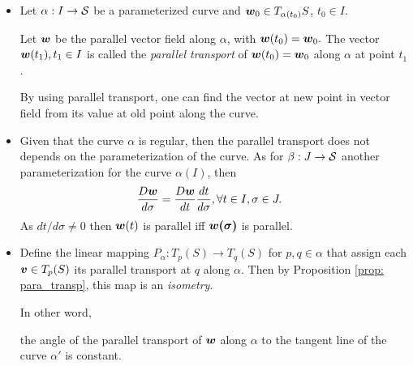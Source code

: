 \documentclass[11pt]{article}
\begin{document}
\begin{itemize}
\item Let $\alpha: I \rightarrow {\mathcal S}$ be a parameterized curve and $\boldsymbol{w}_{0}\in T_{\alpha(t_{0})}S$, $t_{0}\in I$. \begin{definition}
Let $\boldsymbol{w}$ be the parallel vector field along $\alpha$, with $\boldsymbol{w}(t_{0}) = \boldsymbol{w}_{0}.$  The vector $\boldsymbol{w}(t_{1}), t_{1}\in I$ is called the \emph{parallel transport} of $\boldsymbol{w}(t_{0})= \boldsymbol{w}_{0}$ along $\alpha$ at point $t_{1}$. \end{definition}

By using parallel transport, one can find the vector  at new point in vector field from its value at old point along the curve.  

\item \begin{remark}
 Given that the curve $\alpha$ is regular, then the parallel transport does not depends on the parameterization of the curve. As for $\beta: J \rightarrow {\mathcal S}$ another parameterization for the curve $\alpha(I)$, then 
\begin{align*}
\frac{D\boldsymbol{w}}{d\sigma} &= \frac{D\boldsymbol{w}}{dt}\frac{dt}{d\sigma}, \forall t\in I, \sigma\in J.
\end{align*}
As $dt/d\sigma\neq 0$ then $\boldsymbol{w}(t)$ is parallel iff $\boldsymbol{w(\sigma)}$ is parallel. \\
\end{remark}

\item Define the linear mapping $P_{\alpha}: T_{p}(S) \rightarrow T_{q}(S)$ for $p,q\in \alpha$ that assign each $\boldsymbol{v}\in  T_{p}(S)$ its parallel transport at $q$ along $\alpha$. Then by Proposition \ref{prop: para_transp}, this map is an \emph{isometry}.

In other word,  \begin{remark} 
the angle of the parallel transport of $\boldsymbol{w}$ along $\alpha$ to the tangent line of the curve $\alpha'$ is constant.  
\end{remark}



\end{itemize}
\end{document}

